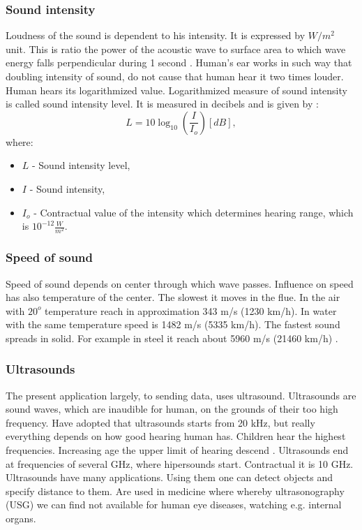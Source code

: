 \documentclass[11pt,titlepage]{article}
\theoremstyle{plain}
\begin{document}
\subsubsection{Sound intensity}
Loudness of the sound is dependent to his intensity. It is expressed by $W/m^2$ unit. This is ratio the power of the acoustic wave to surface area to which wave energy falls perpendicular during 1 second \cite{sound_intensity}. Human's ear works in such way that doubling intensity of sound, do not cause that human hear it two times louder. Human hears its logarithmized value. Logarithmized measure of sound intensity is called sound intensity level. It is measured in decibels and is given by \cite{decibels}:
\begin{equation}
	L = 10\log_{10}\left(\frac{I}{I_o}\right)  [dB],
\end{equation}
where:
\begin{itemize}
	\item $L$ - Sound intensity level,
	\item $I$ - Sound intensity,
	\item $I_o$ - Contractual value of the intensity which determines hearing range, which is $10^{-12}\frac{W}{m^2}.$
\end{itemize}
\subsubsection{Speed of sound}

Speed of sound depends on center through which wave passes. Influence on speed has also temperature of the center. The slowest it moves in the flue. In the air with $20^o$ temperature reach in  approximation 343 m/s (1230 km/h). In water with the same temperature speed is 1482 m/s (5335 km/h). The fastest sound spreads in solid. For example in steel it reach about 5960 m/s (21460 km/h) \cite{sound_speed}.

\subsubsection{Ultrasounds}
The present application largely, to sending data, uses ultrasound. Ultrasounds are sound waves, which are inaudible for human, on the grounds of their too high frequency. Have adopted that ultrasounds starts from 20 kHz, but really everything depends on how good hearing human has. Children hear the highest frequencies. Increasing age the upper limit of hearing descend \cite{limit_sound}. Ultrasounds end at frequencies of several GHz, where hipersounds start. Contractual it is 10 GHz.  Ultrasounds have many applications. Using them one can detect objects and specify distance to them. Are used in medicine where whereby ultrasonography (USG) we can find not available for human eye diseases, watching e.g. internal organs. 
\end{document}
